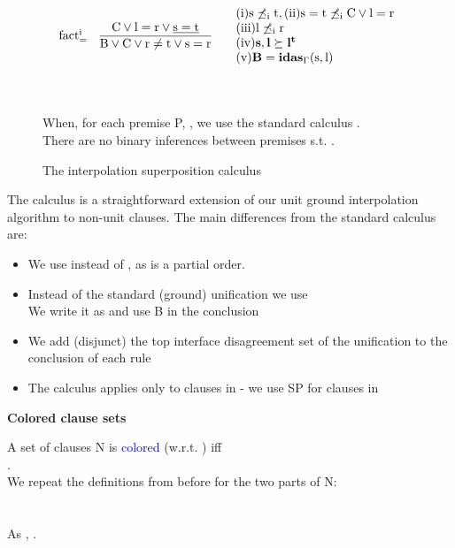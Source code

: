 \begin{figure}
\[\begin{array}{llll}
	\vspace{1cm}
	\m{fact^i_{=}}&
	\vcenter{
		\infer[]
		{\m{B \lor C \lor r \neq t \lor s = r}}
		{
			\m{C \lor l = r \lor \underline{s = t}}
		}
	} &
			\begin{array}{ll}
				\m{\sci{1} s \not\preceq_i t, \sci{2} s=t \not\preceq_i C \lor l=r }\\
				\m{\sci{3} l \not\preceq_i r}\\
				\m{\sci{4} \mathbf{s,l \succeq l^t}}\\
				\m{\sci{5} \mathbf{B = \idasg{s}{l}}}
			\end{array}	\\

\end{array}
\]

When, for each premise P, , we use the standard calculus \SPG{}.\\
There are no binary inferences between premises  s.t. .

\caption{
The interpolation superposition calculus 
}
\label{SP_I}
\end{figure}

The calculus  is a straightforward extension of our unit ground interpolation algorithm to non-unit clauses.
The main differences from the standard calculus \SPG{} are:
\begin{itemize}
	\item We use  instead of \m{\succ}, as  is a partial order.
	\item Instead of the standard (ground) unification  we use \\
		We write it as  and use B in the conclusion
	\item We add (disjunct) the top interface disagreement set of the unification to the conclusion of each rule 
	\item The calculus applies only to clauses in  - we use SP for clauses in 
\end{itemize}


\begin{definition}{\textbf{Colored clause sets}}

\noindent
A set of clauses N is \textcolor{blue}{colored} (w.r.t. ) iff \\
.\\
We repeat the definitions from before for the two parts of N:\\
\\
\\
As , .
\label{coloured_set}
\end{definition}

